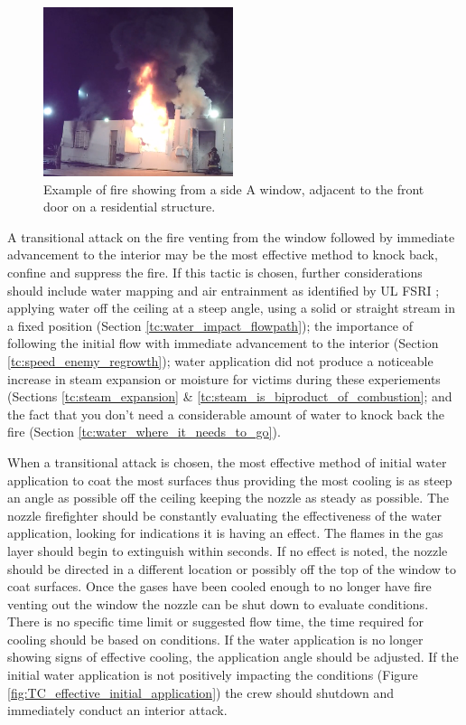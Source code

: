 \documentclass[12pt,oneside]{book}
\begin{document}
\begin{figure}[H]
\centering
\includegraphics[width=0.495\textwidth]{../0_Images/Tactical_Considerations/Transitional_Attack/SIDE_A}
\caption[Example - Fire Showing - Side A]{Example of fire showing from a side A window, adjacent to the front door on a residential structure.}
\label{fig:transitional_attack_TC_fire_showing}
\end{figure}

A transitional attack on the fire venting from the window followed by immediate advancement to the interior may be the most effective method to knock back, confine and suppress the fire. If this tactic is chosen, further considerations should include water mapping and air entrainment as identified by UL FSRI \cite{Weinchenk_watermapping} \cite{Weinchenk_airentrainment}; applying water off the ceiling at a steep angle, using a solid or straight stream in a fixed position (Section \ref{tc:water_impact_flowpath}); the importance of following the initial flow with immediate advancement to the interior (Section \ref{tc:speed_enemy_regrowth}); water application did not produce a noticeable increase in steam expansion or moisture for victims during these experiements (Sections \ref{tc:steam_expansion} \& \ref{tc:steam_is_biproduct_of_combustion}; and the fact that you don't need a considerable amount of water to knock back the fire (Section \ref{tc:water_where_it_needs_to_go}).

When a transitional attack is chosen, the most effective method of initial water application to coat the most surfaces thus providing the most cooling is as steep an angle as possible off the ceiling keeping the nozzle as steady as possible. The nozzle firefighter should be constantly evaluating the effectiveness of the water application, looking for indications it is having an effect. The flames in the gas layer should begin to extinguish within seconds. If no effect is noted, the nozzle should be directed in a different location or possibly off the top of the window to coat surfaces. Once the gases have been cooled enough to no longer have fire venting out the window the nozzle can be shut down to evaluate conditions. There is no specific time limit or suggested flow time, the time required for cooling should be based on conditions. If the water application is no longer showing signs of effective cooling, the application angle should be adjusted. If the initial water application is not positively impacting the conditions (Figure \ref{fig:TC_effective_initial_application}) the crew should shutdown and immediately conduct an interior attack.
\end{document}
